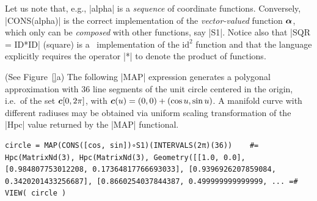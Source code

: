 \begin{coding}[Algebraic computation of FE = $\delta_1$]
{%

%


\begin{remark}
Let us note that, e.g., |alpha| is a \emph{sequence} of
coordinate functions.  Conversely, |CONS(alpha)| is the correct
implementation of the \emph{vector-valued} function ${\mbox{\boldmath $\alpha$}}$,
which only can be \emph{composed} with other functions, say
|S1|.
Notice also that |SQR = ID*ID| (square) is a \pl\ implementation of the
$\mbox{id}^{2}$ function and that the language explicitly requires the
operator |*| to denote the product of functions.
\end{remark}


\begin{condition}[(Circle] (See Figure~\ref{}a)
The following |MAP| expression generates a pol\-y\-gonal approximation with 36 line segments  of the unit circle centered in the origin, i.e.~of the set  ${\mbox{\boldmath $c$}}[0,2\pi]$, with ${\mbox{\boldmath $c$}}(u) = (0, 0) + (\cos u, \sin u)$. A manifold curve with different radiuses may be obtained via uniform scaling transformation of the |Hpc| value returned by the |MAP| functional.
\begin{lstlisting}[language=JuliaLocal, style=julia, mathescape=true]
circle = MAP(CONS([cos, sin])∘S1)(INTERVALS(2π)(36))	#=
Hpc(MatrixNd(3), Hpc(MatrixNd(3), Geometry([[1.0, 0.0], [0.984807753012208, 0.17364817766693033], [0.9396926207859084, 0.3420201433256687], [0.8660254037844387, 0.499999999999999, ... =#
VIEW( circle )
\end{lstlisting}
\end{condition}




}
\end{coding}
